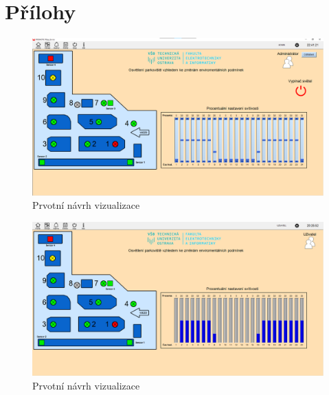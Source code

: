 \chapter*{Přílohy}
\label{Sec-Prilohy}


\begin{figure}[!h]
    \centering\includegraphics[height=.68\textwidth,angle=-90]{Figures/Promotic_admin_vizualizace.png}   
    \caption{Prvotní návrh vizualizace}
    \label{Obr-Viz_admin-01}
\end{figure}

\begin{figure}[!h]
    \centering\includegraphics[height=.68\textwidth,angle=-90]{Figures/Promotic_uzivatel_vizualizace.png}   
    \caption{Prvotní návrh vizualizace}
    \label{Obr-Viz_oper-01}
\end{figure}


\clearpage





\endinput



